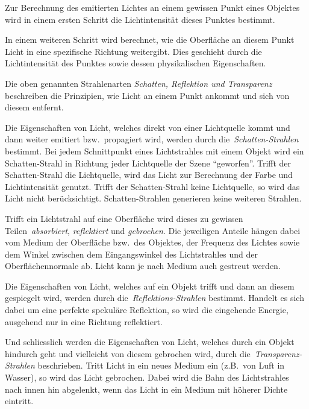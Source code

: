 Zur Berechnung des emitierten Lichtes an einem gewissen Punkt eines Objektes
wird in einem ersten Schritt die Lichtintensität dieses Punktes
bestimmt.

In einem weiteren Schritt wird berechnet, wie die Oberfläche an diesem
Punkt Licht in eine spezifische Richtung weitergibt.  Dies geschieht
durch die Lichtintensität des Punktes sowie dessen physikalischen
Eigenschaften. 

Die oben genannten Strahlenarten \textit{Schatten, Reflektion und
    Transparenz} beschreiben die Prinzipien, wie Licht an einem Punkt
ankommt und sich von diesem entfernt.

Die Eigenschaften von Licht, welches direkt von einer Lichtquelle kommt
und dann weiter emitiert bzw.\ propagiert wird, werden durch
die~\textit{Schatten-Strahlen} bestimmt. Bei jedem Schnittpunkt eines
Lichtstrahles mit einem Objekt wird ein Schatten-Strahl in Richtung jeder
Lichtquelle der Szene ``geworfen''. Trifft der Schatten-Strahl die
Lichtquelle, wird das Licht zur Berechnung der Farbe und Lichtintensität
genutzt. Trifft der Schatten-Strahl keine Lichtquelle, so wird das Licht
nicht berücksichtigt. Schatten-Strahlen generieren keine weiteren
Strahlen.

Trifft ein Lichtstrahl auf eine Oberfläche wird dieses zu gewissen
Teilen~\textit{absorbiert}, \textit{reflektiert} und \textit{gebrochen}.
Die jeweiligen Anteile hängen dabei vom Medium der Oberfläche bzw.\ des
Objektes, der Frequenz des Lichtes sowie dem Winkel zwischen dem
Eingangswinkel des Lichtstrahles und der Oberflächennormale ab. Licht
kann je nach Medium auch gestreut werden.

Die Eigenschaften von Licht, welches auf ein Objekt trifft und dann an
diesem gespiegelt wird, werden durch die~\textit{Reflektions-Strahlen}
bestimmt. Handelt es sich dabei um eine perfekte spekuläre Reflektion,
so wird die eingehende Energie, ausgehend nur in eine Richtung
reflektiert.

Und schliesslich werden die Eigenschaften von Licht, welches durch ein
Objekt hindurch geht und vielleicht von diesem gebrochen wird, durch
die~\textit{Transparenz-Strahlen} beschrieben. Tritt Licht in ein neues
Medium ein (z.B.\ von Luft in Wasser), so wird das Licht gebrochen.
Dabei wird die Bahn des Lichtstrahles nach innen hin abgelenkt, wenn das
Licht in ein Medium mit höherer Dichte eintritt.

